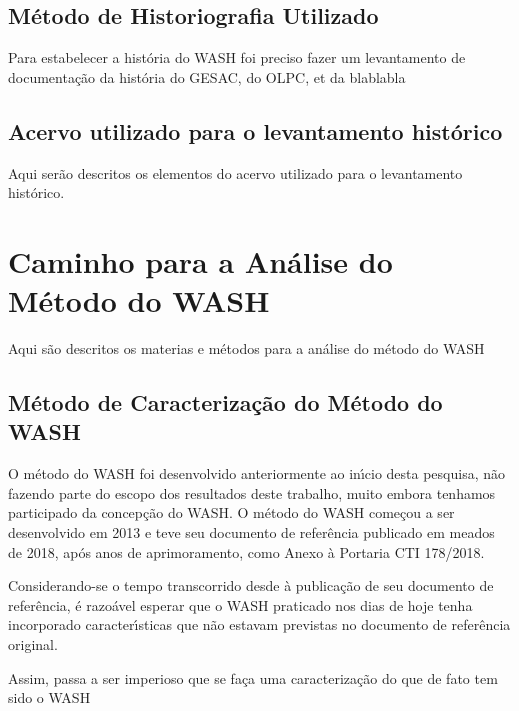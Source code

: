 \documentclass[
12pt,		%
openright,	%
twoside,  %
a4paper,			%
chapter=TITLE,		%
english,			%
french,				%
spanish,			%
brazil				%
]{USPSC-classe/USPSC}
\begin{document}
\subsection[M\'etodo de Historiografia Utilizado ]{M\'etodo de Historiografia Utilizado }\label{M\'etodo de Historiografia Utilizado }
Para estabelecer a hist\'oria do WASH foi preciso fazer um levantamento de documenta\c{c}\~ao da hist\'oria do GESAC, do OLPC, et da blablabla


\subsection[Acervo utilizado para o levantamento hist\'orico]{Acervo utilizado para o levantamento hist\'orico}\label{Acervo utilizado para o levantamento hist\'orico}
Aqui ser\~ao descritos os elementos do acervo utilizado para o levantamento hist\'orico.


\section[Caminho para a An\'alise do M\'etodo do WASH]{Caminho para a An\'alise do M\'etodo do WASH}\label{Caminho para a An\'alise do M\'etodo do WASH}
Aqui s\~ao descritos os materias e m\'etodos para a an\'alise do m\'etodo do WASH


\subsection[M\'etodo de Caracteriza\c{c}\~ao do M\'etodo do WASH]{M\'etodo de Caracteriza\c{c}\~ao do M\'etodo do WASH}\label{M\'etodo de Caracteriza\c{c}\~ao do M\'etodo do WASH}
O m\'etodo do WASH foi desenvolvido anteriormente ao in\'{\i}cio desta pesquisa, n\~ao fazendo parte do escopo dos resultados deste trabalho, muito embora tenhamos participado da concep\c{c}\~ao do WASH. O m\'etodo do WASH come\c{c}ou a ser desenvolvido em 2013 e teve seu documento de refer\^encia publicado em meados de 2018, ap\'os anos de aprimoramento, como Anexo \`a Portaria CTI 178/2018.


Considerando-se o tempo transcorrido desde \`a publica\c{c}\~ao de seu documento de refer\^encia, \'e razo\'avel esperar que o WASH praticado nos dias de hoje tenha incorporado caracter\'{\i}sticas que n\~ao estavam previstas no documento de refer\^encia original.


Assim, passa a ser imperioso que se fa\c{c}a uma caracteriza\c{c}\~ao do que de fato tem sido o WASH
\end{document}
